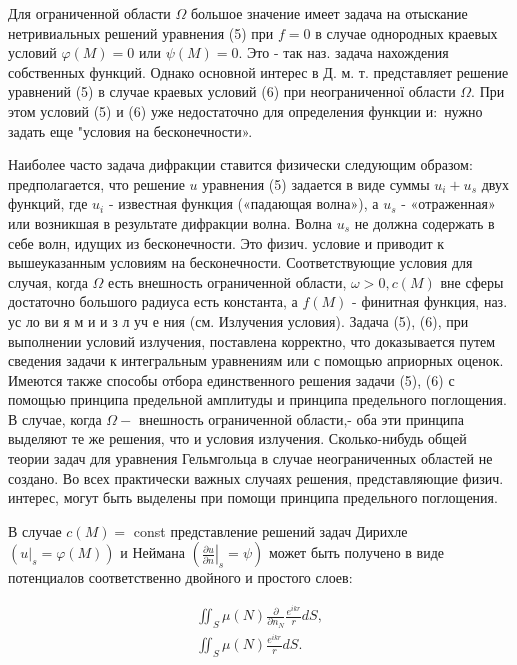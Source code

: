 \documentclass[10pt]{article}
\begin{document}
Для ограниченной области $\Omega$ большое значение имеет задача на отыскание нетривиальных решений уравнения (5) при $f=0$ в случае однородных краевых условий $\varphi(M)=0$ или $\psi(M)=0$. Это - так наз. задача нахождения собственных функций. Однако основной интерес в Д. м. т. представляет решение уравнений (5) в случае краевых условий (6) при неограниченної области $\Omega$. При этом условий (5) и (6) уже недостаточно для определения функции $и:$ нужно задать еще "условия на бесконечности».



Наиболее часто задача дифракции ставится физически следующим образом: предполагается, что решение $u$ уравнения (5) задается в виде суммы $u_{i}+u_{s}$ двух функций, где $u_{i}$ - известная функция («падающая волна»), а $u_{s}$ - «отраженная» или возникшая в результате дифракции волна. Волна $u_{s}$ не должна содержать в себе волн, идущих из бесконечности. Это физич. условие и приводит к вышеуказанным условиям на бесконечности. Соответствующие условия для случая, когда $\Omega$ есть внешность ограниченной области, $\omega>0, c(M)$ вне сферы достаточно большого радиуса есть константа, а $f(M)$ - финитная функция, наз. ус ло ви я м и и з л уч е ния (см. Излучения условия). Задача (5), (6), при выполнении условий излучения, поставлена корректно, что доказывается путем сведения задачи к интегральным уравнениям или с помощью априорных оценок. Имеются также способы отбора единственного решения задачи (5), (6) с помощью принципа предельной амплитуды и принципа предельного поглощения. В случае, когда $\Omega-$ внешность ограниченной области,- оба эти принципа выделяют те же решения, что и условия излучения. Сколько-нибудь общей теории задач для уравнения Гельмгольца в случае неограниченных областей не создано. Во всех практически важных случаях решения, представляющие физич. интерес, могут быть выделены при помощи принципа предельного поглощения.



В случае $c(M)=$ const представление решений задач Дирихле $\left(\left.u\right|_{s}=\varphi(M)\right)$ и Неймана $\left(\left.\frac{\partial u}{\partial n}\right|_{s}=\psi\right)$ может быть получено в виде потенциалов соответственно двойного и простого слоев:



\[

\begin{gathered}

\iint_{S} \mu(N) \frac{\partial}{\partial n_{N}} \frac{e^{i k r}}{r} d S, \\

\iint_{S} \mu(N) \frac{e^{i k r}}{r} d S .

\end{gathered}

\]
\end{document}
